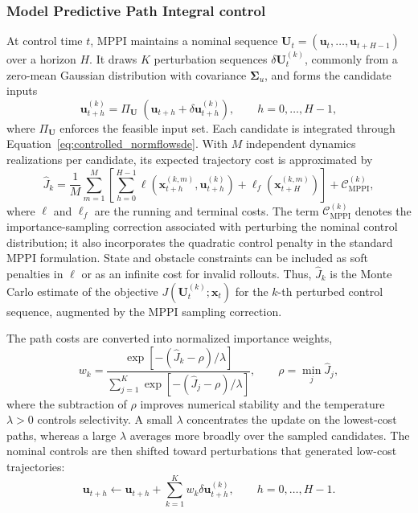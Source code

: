 \subsubsection{Model Predictive Path Integral control}
At control time $t$, MPPI maintains a nominal sequence
$\boldsymbol{U}_t=(\boldsymbol{u}_t,\ldots,\boldsymbol{u}_{t+H-1})$ over a horizon $H$. It draws $K$ perturbation sequences
$\delta\boldsymbol{U}_t^{(k)}$, commonly from a zero-mean Gaussian distribution with covariance $\boldsymbol{\Sigma}_u$, and forms the candidate inputs
\begin{equation}
    \boldsymbol{u}_{t+h}^{(k)}
    =\Pi_{\boldsymbol{U}}\;\left(
    \boldsymbol{u}_{t+h}+\delta\boldsymbol{u}_{t+h}^{(k)}\right),
    \qquad h=0,\ldots,H-1,
\end{equation}
where $\Pi_{\boldsymbol{U}}$ enforces the feasible input set. Each candidate is integrated through Equation~\ref{eq:controlled_normflowsde}. With $M$ independent dynamics realizations per candidate, its expected trajectory cost is approximated by
\begin{equation}
    \widehat{J}_k
    =\frac{1}{M}\sum_{m=1}^{M}\left[
    \sum_{h=0}^{H-1}
    \ell(\boldsymbol{x}_{t+h}^{(k,m)},
         \boldsymbol{u}_{t+h}^{(k)})
    +\ell_f(\boldsymbol{x}_{t+H}^{(k,m)})
    \right]+\mathcal{C}_{\text{MPPI}}^{(k)},
    \label{eq:normflowsde_mppi_cost}
\end{equation}
where $\ell$ and $\ell_f$ are the running and terminal costs. The term
$\mathcal{C}_{\text{MPPI}}^{(k)}$ denotes the importance-sampling correction associated with perturbing the nominal control distribution; it also incorporates the quadratic control penalty in the standard MPPI formulation. State and obstacle constraints can be included as soft penalties in $\ell$ or as an infinite cost for invalid rollouts. Thus, $\widehat{J}_k$ is the Monte Carlo estimate of the objective $J(\boldsymbol{U}_t^{(k)};\boldsymbol{x}_t)$ for the $k$-th perturbed control sequence, augmented by the MPPI sampling correction.

The path costs are converted into normalized importance weights,
\begin{equation}
    w_k=\frac{\exp[-(\widehat{J}_k-\rho)/\lambda]}
    {\sum_{j=1}^{K}\exp[-(\widehat{J}_j-\rho)/\lambda]},
    \qquad \rho=\min_j\widehat{J}_j,
    \label{eq:normflowsde_mppi_weights}
\end{equation}
where the subtraction of $\rho$ improves numerical stability and the temperature $\lambda>0$ controls selectivity. A small $\lambda$ concentrates the update on the lowest-cost paths, whereas a large $\lambda$ averages more broadly over the sampled candidates. The nominal controls are then shifted toward perturbations that generated low-cost trajectories:
\begin{equation}
    \boldsymbol{u}_{t+h}\leftarrow\boldsymbol{u}_{t+h}
    +\sum_{k=1}^{K}w_k\delta\boldsymbol{u}_{t+h}^{(k)},
    \qquad h=0,\ldots,H-1.
    \label{eq:normflowsde_mppi_update}
\end{equation}

